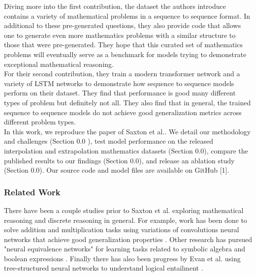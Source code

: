 Diving more into the first contribution, the dataset the authors introduce contains a variety of mathematical problems in a sequence to sequence format. In additional to these pre-generated questions, they also provide code that allows one to generate even more mathematics problems with a similar structure to those that were pre-generated. They hope that this curated set of mathematics problems will eventually serve as a benchmark for models trying to demonstrate exceptional mathematical reasoning.  \\

For their second contribution, they train a modern transformer network and a variety of LSTM networks \supercite{hochreiter1997long} to demonstrate how sequence to sequence models perform on their dataset. They find that performance is good many different types of problem but definitely not all. They also find that in general, the trained sequence to sequence models do not achieve good generalization metrics across different problem types.  \\ 


In this work, we reproduce the paper of Saxton et al.\supercite{DBLP:journals/corr/abs-1904-01557}. We detail our methodology and challenges (Section 0.0 ), test model performance on the released interpolation and extrapolation mathematics datasets (Section 0.0), compare the published results to our findings (Section 0.0),  and release an ablation study (Section 0.0).  Our source code and model files are available on GitHub [1].


\subsubsection{Related Work}

There have been a couple studies prior to Saxton et al. \supercite{DBLP:journals/corr/abs-1904-01557} exploring mathematical reasoning and discrete reasoning in general. For example, work has been done to solve addition and multiplication tasks using variations of convolutions neural networks that achieve good generalization properties \supercite{kaiser2015neural}. Other research has pursued "neural equivalence networks" for learning tasks related to symbolic algebra and boolean expressions \supercite{allamanis2017learning}. Finally there has also been progress by Evan et al. using tree-structured neural networks to understand logical entailment \supercite{evans2018neural}.   \\

